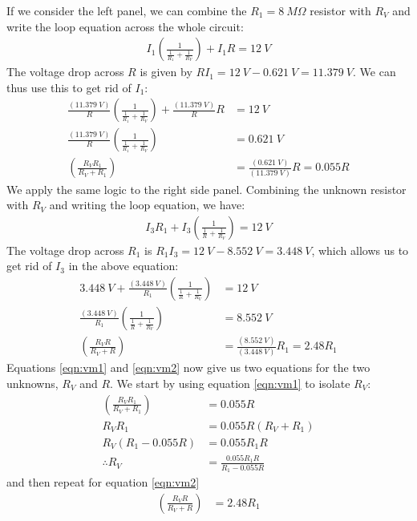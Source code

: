 \begin{solution}
If we consider the left panel, we can combine the $R_1=\SI{8}{M\Omega}$ resistor with $R_V$ and write the loop equation across the whole circuit:
\begin{align*}
I_1\left( \frac{1}{\frac{1}{R_1}+\frac{1}{R_V}} \right)+I_1R=\SI{12}{V}
\end{align*}
The voltage drop across $R$ is given by $RI_1=\SI{12}{V}-\SI{0.621}{V}=\SI{11.379}{V}$. We can thus use this to get rid of $I_1$:
\begin{align}
\label{eqn:vm1}
\frac{(\SI{11.379}{V})}{R}\left( \frac{1}{\frac{1}{R_1}+\frac{1}{R_V}} \right)+\frac{(\SI{11.379}{V})}{R}R&=\SI{12}{V}\nonumber\\
\frac{(\SI{11.379}{V})}{R}\left( \frac{1}{\frac{1}{R_1}+\frac{1}{R_V}} \right)&=\SI{0.621}{V}\nonumber\\
\left( \frac{R_VR_1}{R_V+R_1} \right)&=\frac{(\SI{0.621}{V})}{(\SI{11.379}{V})}R=0.055R
\end{align}
We apply the same logic to the right side panel. Combining the unknown resistor with $R_V$ and writing the loop equation, we have:
\begin{align*}
I_3R_1+I_3\left( \frac{1}{\frac{1}{R}+\frac{1}{R_V}} \right)=\SI{12}{V}
\end{align*}
The voltage drop across $R_1$ is $R_1I_3=\SI{12}{V}-\SI{8.552}{V}=\SI{3.448}{V}$, which allows us to get rid of $I_3$ in the above equation:
\begin{align}
\label{eqn:vm2}
\SI{3.448}{V}+\frac{(\SI{3.448}{V})}{R_1}\left( \frac{1}{\frac{1}{R}+\frac{1}{R_V}} \right)&=\SI{12}{V}\nonumber\\
\frac{(\SI{3.448}{V})}{R_1}\left( \frac{1}{\frac{1}{R}+\frac{1}{R_V}} \right)&=\SI{8.552}{V}\nonumber\\
\left( \frac{R_VR}{R_V+R} \right)&=\frac{(\SI{8.552}{V})}{(\SI{3.448}{V})}R_1=2.48R_1
\end{align}
Equations \ref{eqn:vm1} and \ref{eqn:vm2} now give us two equations for the two unknowns, $R_V$ and $R$. We start by using equation \ref{eqn:vm1} to isolate $R_V$:
\begin{align*}
\left( \frac{R_VR_1}{R_V+R_1} \right)&=0.055R\\
R_VR_1&=0.055R(R_V+R_1)\\
R_V(R_1-0.055R)&=0.055R_1R\\
\therefore R_V&=\frac{0.055R_1R}{R_1-0.055R}
\end{align*}
and then repeat for equation \ref{eqn:vm2}
\begin{align*}
\left( \frac{R_VR}{R_V+R} \right)&=2.48R_1\\

\end{align*}
\end{solution}
